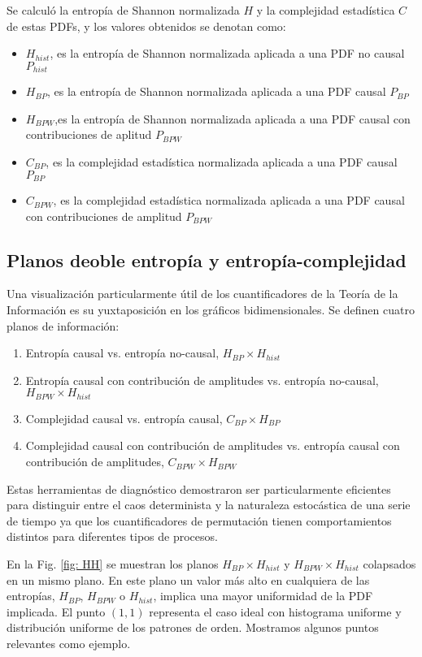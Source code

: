 Se calculó la entropía de Shannon normalizada $H$ y la complejidad estadística $C$ de estas PDFs, y los valores obtenidos se denotan como:
\begin{itemize}
	\item $H_{hist}$, es la entropía de Shannon normalizada aplicada a una PDF no causal $P_{hist}$
	\item $H_{BP}$, es la entropía de Shannon normalizada aplicada a una PDF causal $P_{BP}$
	\item $H_{BPW}$,es la entropía de Shannon normalizada aplicada a una PDF causal con contribuciones de aplitud $P_{BPW}$
	\item $C_{BP}$, es la complejidad estadística normalizada aplicada a una PDF causal $P_{BP}$
	\item $C_{BPW}$, es la complejidad estadística normalizada aplicada a una PDF causal con contribuciones de amplitud $P_{BPW} $
\end{itemize}

\subsection{Planos deoble entropía y entropía-complejidad}

Una visualización particularmente útil de los cuantificadores de la Teoría de la Información es su yuxtaposición en los gráficos bidimensionales.
Se definen cuatro planos de información:
\begin{enumerate}
	\item Entropía causal vs. entropía no-causal, $H_{BP} \times H_{hist}$
	\item Entropía causal con contribución de amplitudes vs. entropía no-causal, $H_{BPW} \times H_{hist}$
	\item Complejidad causal vs. entropía causal, $C_{BP} \times H_{BP}$
	\item Complejidad causal con contribución de amplitudes vs. entropía causal con contribución de amplitudes, $C_{BPW} \times H_{BPW}$
\end{enumerate}

Estas herramientas de diagnóstico demostraron ser particularmente eficientes para distinguir entre el caos determinista y la naturaleza estocástica de una serie de tiempo ya que los cuantificadores de permutación tienen comportamientos distintos para diferentes tipos de procesos.

En la Fig. \ref{fig: HH} se muestran los planos $H_ {BP} \times H_{hist}$ y $H_{BPW} \times H_{hist}$ colapsados en un mismo plano.
En este plano un valor más alto en cualquiera de las entropías, $H_{BP}$, $H_{BPW}$ o $H_{hist}$, implica una mayor uniformidad de la PDF implicada.
El punto $(1, 1)$ representa el caso ideal con histograma uniforme y distribución uniforme de los patrones de orden.
Mostramos algunos puntos relevantes como ejemplo.

